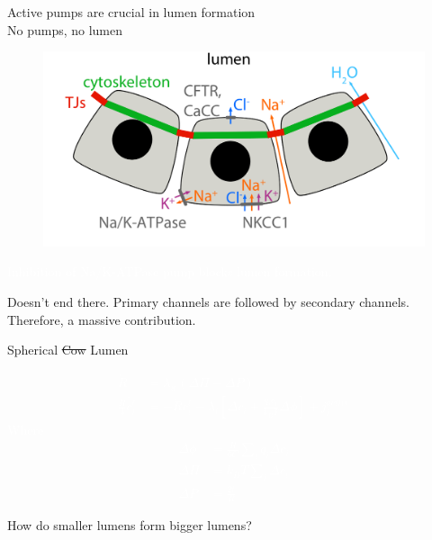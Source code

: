 \documentclass{beamer}
\begin{document}
\begin{frame}{\textcolor{yellow!10!blue!50!white!50}{Active pumps are crucial in lumen formation\\
No pumps, no lumen}}

\begin{figure}
\includegraphics[scale=0.2]{active.png}
\end{figure}

\textcolor{white}{Inhibition of Na/K-ATPase pump blocks lumen formation.}

\textcolor{blue!20}{Doesn't end there. Primary channels are followed by secondary channels. Therefore, a massive contribution.}
\end{frame}




\begin{frame}{\textcolor{yellow!10!blue!50!white!50}{Spherical \st{Cow} Lumen}}


\textcolor{white}{
\begin{align*}
\dot{R} &= \lambda_w (\Delta \Pi - \Delta P)\\
\frac{R}{3} \dot{c_i^{\ell}} &= -\dot{R} c_i^{\ell} - \lambda_i [\Delta c_i + \frac{q_i \overline{c_i}}{k_B T} \Delta \phi] + j_i^{active}
\end{align*}
Where
\begin{align*}
\Delta \phi &= \frac{R}{6C} \sum_{i} q_i \Delta c_i\\
\Delta \Pi &= k_B T \sum_i \Delta c_i\\
\Delta P &= \frac{2t}{R}
\end{align*}
}
\end{frame}




\begin{frame}{\textcolor{yellow!10!blue!50!white!50}{How do smaller lumens form bigger lumens?}}
\begin{center}
\end{center} 


\end{frame}
\end{document}
